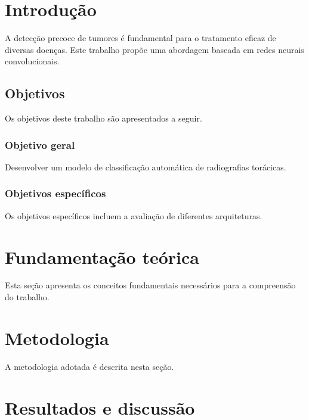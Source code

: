 \documentclass{abnt-trabalho-academico}
\begin{document}
\imprimirsumario

\textual

\chapter{Introdução}

A detecção precoce de tumores é fundamental para o tratamento eficaz de
diversas doenças. Este trabalho propõe uma abordagem baseada em redes
neurais convolucionais.

\section{Objetivos}

Os objetivos deste trabalho são apresentados a seguir.

\subsection{Objetivo geral}

Desenvolver um modelo de classificação automática de radiografias torácicas.

\subsection{Objetivos específicos}

Os objetivos específicos incluem a avaliação de diferentes arquiteturas.

\chapter{Fundamentação teórica}

Esta seção apresenta os conceitos fundamentais necessários para a
compreensão do trabalho.

\chapter{Metodologia}

A metodologia adotada é descrita nesta seção.

\chapter{Resultados e discussão}
\end{document}
